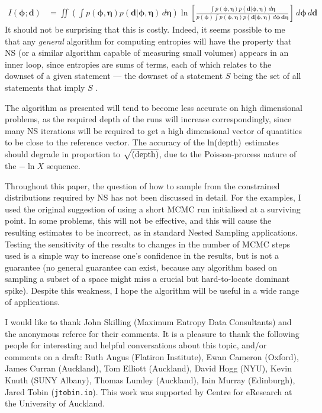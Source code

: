 \documentclass[entropy,article,accept,oneauthor,pdftex,10pt,a4paper]{mdpi}
\newcommand{\revision}{\color{darkblue}}
\renewcommand{\d}{\boldsymbol{d}}
\newcommand{\bphi}{\boldsymbol{\phi}}
\newcommand{\boldeta}{\boldsymbol{\eta}}
\newcommand{\depth}{(\textnormal{depth})}
\begin{document}
\begin{align}
I(\bphi; \d) &= \iint
  \left(\int p(\bphi, \boldeta)p(\d | \bphi, \boldeta) \, d\boldeta\right)
                        \ln \left[
  \frac{\int p(\bphi, \boldeta)p(\d | \bphi, \boldeta) \, d\boldeta}
{p(\bphi)\int p(\bphi, \boldeta)p(\d | \bphi, \boldeta) \, d\bphi \, \d\boldeta}\right]
                        \, d\bphi \, d\d
\end{align}
It should not be surprising that this is costly. Indeed, it seems possible
to me that any {\em general} algorithm for computing entropies will have the
property that NS (or a similar algorithm capable of measuring small volumes)
appears in an inner loop, since entropies are sums of terms, each of which
relates to the downset of a given statement --- the downset of a statement
$S$ being the set of all statements that imply $S$ \citep{knuth_questions}.

The algorithm as presented will tend to become less accurate on high dimensional
problems, as the required depth of the runs will increase correspondingly,
since many NS iterations will be required to get a high dimensional vector
of quantities to be close to the reference vector.
The accuracy of the $\ln\depth$ estimates should degrade in proportion to
$\sqrt{\depth}$, due to the Poisson-process nature of the $-\ln X$ sequence.

Throughout this paper, the question of how to sample from the constrained
distributions required by NS has not been discussed in detail. For the examples,
I used the original \citet{skilling2006nested} suggestion of using a short MCMC run
initialised at a surviving point. In some problems, this will not be effective,
and this will cause the resulting estimates to be incorrect, as in standard
Nested Sampling applications. Testing the sensitivity of the results to
changes in the number of MCMC steps used is a simple way to increase one's
confidence in the results, but is not a guarantee {\revision (no general guarantee can
exist, because any algorithm based on sampling a subset of a space might miss
a crucial but hard-to-locate dominant spike)}.
Despite this weakness, I hope the algorithm will be
useful in a wide range of applications.

{\revision I would like to thank John Skilling
(Maximum Entropy Data Consultants) and the
anonymous referee for their comments.}
It is a pleasure to thank the following people for interesting and helpful
conversations about this topic, and/or comments on a draft:
Ruth Angus (Flatiron Institute),
Ewan Cameron (Oxford), James Curran (Auckland), Tom Elliott (Auckland),
David Hogg (NYU), Kevin Knuth (SUNY Albany),
Thomas Lumley (Auckland),
Iain Murray (Edinburgh), Jared Tobin ({\tt jtobin.io}).
This work was supported by Centre for eResearch
at the University of Auckland.
\end{document}
